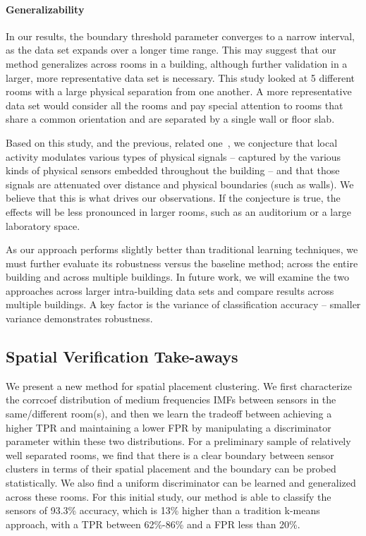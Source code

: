 \paragraph{Generalizability} In our results, the boundary threshold parameter converges to a narrow interval, as the data set expands 
over a longer time range.  This may suggest that our method generalizes across rooms in a building, although further validation in a 
larger, more representative data set is necessary.  This study looked at 5 different rooms with a large physical separation from one
another.  A more representative data set would consider all the rooms and pay special attention to rooms that share a common orientation
and are separated by a single wall or floor slab.
  
Based on this study, and the previous, related one~\cite{IOT}, we conjecture that local activity modulates various types of physical 
signals -- captured by the various kinds of physical sensors embedded
throughout the building -- and that those signals are attenuated
over distance and physical boundaries (such as walls).  We believe that this is what drives our observations. 
If the conjecture is true, the effects will be less pronounced in larger rooms, such as an auditorium or a large laboratory space.


As our approach performs slightly better than traditional learning techniques, we must further evaluate its robustness
versus the baseline method; across the entire building and across multiple buildings.  In future work, we will examine the 
two approaches across larger intra-building data sets and compare results across multiple buildings.
A key factor is the variance of classification accuracy -- smaller variance demonstrates robustness.  


\subsection{Spatial Verification Take-aways}
We present a new method for spatial placement clustering.  
We first characterize the corrcoef distribution of medium frequencies IMFs between sensors in the same/different room(s), and then we learn the tradeoff between achieving a higher TPR and maintaining a lower FPR by manipulating a discriminator parameter within these two distributions. 
For a preliminary sample of relatively well separated rooms, we find that there is a clear boundary between sensor clusters in terms of their spatial placement and the boundary can be probed statistically.  We also find 
a uniform discriminator can be learned and generalized across these rooms.  
For this initial study, our method is able to classify the sensors of 93.3\% accuracy, which is 13\% higher than a tradition k-means approach, with a TPR between 62\%-86\% and a FPR less than 20\%. 


